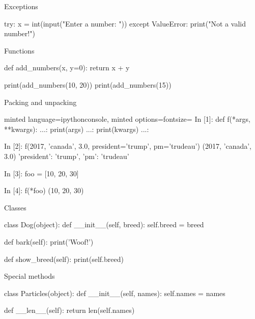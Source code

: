 \documentclass[noamssymb,svgnames]{beamer}
\begin{document}
\begin{frame}[fragile]{Exceptions}
  \begin{python}
      try:
          x = int(input("Enter a number: "))
      except ValueError:
          print("Not a valid number!")
  \end{python}
\end{frame}

\begin{frame}[fragile]{Functions}
  \begin{python}
      def add_numbers(x, y=0):
          return x + y

      print(add_numbers(10, 20))
      print(add_numbers(15))
  \end{python}
\end{frame}

\begin{frame}[fragile]{Packing and unpacking}
  \begin{tcblisting}{minted language=ipythonconsole,
      minted options={fontsize=\footnotesize}}
      In [1]: def f(*args, **kwargs):
         ...:     print(args)
         ...:     print(kwargs)
         ...:

      In [2]: f(2017, 'canada', 3.0, president='trump',
                pm='trudeau')
      (2017, 'canada', 3.0)
      {'president': 'trump', 'pm': 'trudeau'}

      In [3]: foo = [10, 20, 30]

      In [4]: f(*foo)
      (10, 20, 30)
      {}
  \end{tcblisting}
\end{frame}

\begin{frame}[fragile]{Classes}
  \begin{python}
      class Dog(object):
          def __init__(self, breed):
              self.breed = breed

          def bark(self):
              print('Woof!')

          def show_breed(self):
              print(self.breed)
  \end{python}
\end{frame}

\begin{frame}[fragile]{Special methods}
  \begin{python}
      class Particles(object):
          def __init__(self, names):
              self.names = names

          def __len__(self):
              return len(self.names)
  \end{python}
\end{frame}
\end{document}
